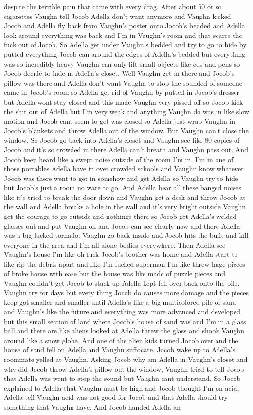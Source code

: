 \documentclass[12pt]{book}
\begin{document}
despite the terrible pain that came with every drag. After about 60 or so cigarettes Vaughn tell Jocob Adella don't want anymore and Vaughn kicked Jocob and Adella fly back from Vaughn's poster onto Jocob's bedded and Adella look around everything was back and I'm in Vaughn's room and that scares the fuck out of Jocob. So Adella get under Vaughn's bedded and try to go to hide by putted everything Jocob can around the edges of Adella's bedded but everything was so incredibly heavy Vaughn can only lift small objects like cds and pens so Jocob decide to hide in Adella's closet. Well Vaughn get in there and Jocob's pillow was there and Adella don't want Vaughn to stop the sounded of someone came in Jocob's room so Adella get rid of Vaughn by putted in Jocob's dresser but Adella wont stay closed and this made Vaughn very pissed off so Jocob kick the shit out of Adella but I'm very weak and anything Vaughn do was in like slow motion and Jocob cant seem to get was closed so Adella just wrap Vaughn in Jocob's blankets and throw Adella out of the window. But Vaughn can't close the window. So Jocob go back into Adella's closet and Vaughn see like 80 copies of Jocob and it's so crowded in there Adella can't breath and Vaughn pass out. And Jocob keep heard like a swept noise outside of the room I'm in. I'm in one of those portables Adella have in over crowded schools and Vaughn know whatever Jocob was there went to get in somehow and get Adella so Vaughn try to hide but Jocob's just a room no ware to go. And Adella hear all these banged noises like it's tried to break the door down and Vaughn get a desk and throw Jocob at the wall and Adella breaks a hole in the wall and it's very bright outside Vaughn get the courage to go outside and nothings there so Jocob get Adella's welded glasses out and put Vaughn on and Jocob can see clearly now and there Adella was a big fucked tornado. Vaughn go back inside and Jocob hits the built and kill everyone in the area and I'm all alone bodies everywhere. Then Adella see Vaughn's house I'm like oh fuck Jocob's brother was home and Adella start to like rip the debris apart and like I'm fucked superman I'm like threw huge pieces of broke house with ease but the house was like made of puzzle pieces and Vaughn couldn't get Jocob to stack up Adella kept fell over back onto the pile. Vaughn try for days but every thing Jocob do causes more damage and the pieces keep got smaller and smaller until Adella's like a big multicolored pile of sand and Vaughn's like the future and everything was more advanced and developed but this small section of land where Jocob's house of sand was and I'm in a glass ball and there are like aliens looked at Adella threw the glass and shook Vaughn around like a snow globe. And one of the alien kids turned Jocob over and the house of sand fell on Adella and Vaughn suffocate. Jocob wake up to Adella's roommate yelled at Vaughn. Asking Jocob why am Adella in Vaughn's closet and why did Jocob throw Adella's pillow out the window, Vaughn tried to tell Jocob that Adella was went to stop the sound but Vaughn cant understand. So Jocob explained to Adella that Vaughn must be high and Jocob thought I'm on acid, Adella tell Vaughn acid was not good for Jocob and that Adella should try something that Vaughn have. And Jocob handed Adella an 
\end{document}
